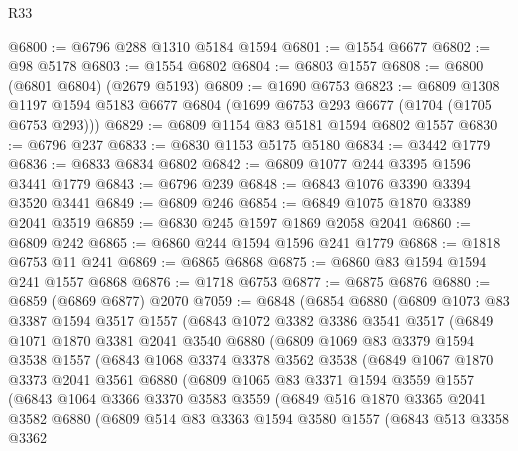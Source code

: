 \begin{lexlean}{R33}
\begin{coremodule}
@6800 := @6796 @288 @1310 @5184 @1594
@6801 := @1554 @6677
@6802 := @98 @5178
@6803 := @1554 @6802
@6804 := @6803 @1557
@6808 := @6800 (@6801 @6804) (@2679 @5193)
@6809 := @1690 @6753
@6823 := @6809
    @1308
    @1197
    @1594
    @5183
    @6677
    @6804
    (@1699 @6753 @293 @6677 (@1704 (@1705 @6753 @293)))
@6829 := @6809 @1154 @83 @5181 @1594 @6802 @1557
@6830 := @6796 @237
@6833 := @6830 @1153 @5175 @5180
@6834 := @3442 @1779
@6836 := @6833 @6834 @6802
@6842 := @6809 @1077 @244 @3395 @1596 @3441 @1779
@6843 := @6796 @239
@6848 := @6843 @1076 @3390 @3394 @3520 @3441
@6849 := @6809 @246
@6854 := @6849 @1075 @1870 @3389 @2041 @3519
@6859 := @6830 @245 @1597 @1869 @2058 @2041
@6860 := @6809 @242
@6865 := @6860 @244 @1594 @1596 @241 @1779
@6868 := @1818 @6753 @11 @241
@6869 := @6865 @6868
@6875 := @6860 @83 @1594 @1594 @241 @1557 @6868
@6876 := @1718 @6753
@6877 := @6875 @6876
@6880 := @6859 (@6869 @6877) @2070
@7059 := @6848
    (@6854
      @6880
      (@6809
        @1073
        @83
        @3387
        @1594
        @3517
        @1557
        (@6843
          @1072
          @3382
          @3386
          @3541
          @3517
          (@6849
            @1071
            @1870
            @3381
            @2041
            @3540
            @6880
            (@6809
              @1069
              @83
              @3379
              @1594
              @3538
              @1557
              (@6843
                @1068
                @3374
                @3378
                @3562
                @3538
                (@6849
                  @1067
                  @1870
                  @3373
                  @2041
                  @3561
                  @6880
                  (@6809
                    @1065
                    @83
                    @3371
                    @1594
                    @3559
                    @1557
                    (@6843
                      @1064
                      @3366
                      @3370
                      @3583
                      @3559
                      (@6849
                        @516
                        @1870
                        @3365
                        @2041
                        @3582
                        @6880
                        (@6809
                          @514
                          @83
                          @3363
                          @1594
                          @3580
                          @1557
                          (@6843
                            @513
                            @3358
                            @3362

\end{coremodule}
\end{lexlean}
